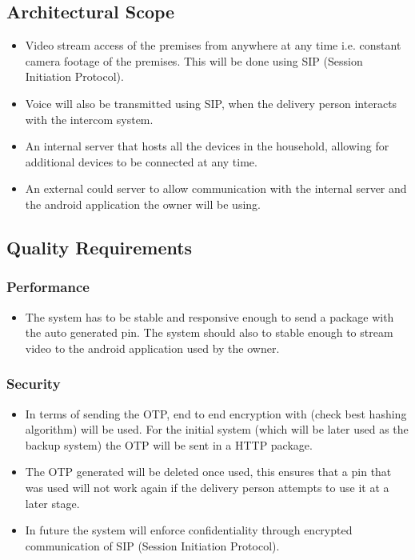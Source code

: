 \documentclass[a4paper,12pt]{article}
\begin{document}
	\newpage
	\subsection{Architectural Scope}
	\begin{itemize}
		\item Video stream access of the premises from anywhere at any time i.e. constant camera footage of the premises. This will be done using SIP (Session Initiation Protocol).
		
		\item Voice will also be transmitted using SIP, when the delivery person interacts with the intercom system.
		
		\item An internal server that hosts all the devices in the household, allowing for additional devices to be connected at any time. 
		
		\item An external could server to allow communication with the internal server and the android application the owner will be using. 
	\end{itemize}
	
	\subsection{Quality Requirements}
	
	\subsubsection{Performance}
	\begin{itemize}
		\item The system has to be stable and responsive enough to send a package with the auto generated pin. The system should also to stable enough to stream video to the android application used by the owner. 
	\end{itemize}
	
	\subsubsection{Security}
	\begin{itemize}
		\item In terms of sending the OTP, end to end encryption with (check best hashing algorithm) will be used. For the initial system (which will be later used as the backup system) the OTP will be sent in a HTTP package. 
		\item The OTP generated will be deleted once used, this ensures that a pin that was used will not work again if the delivery person attempts to use it at a later stage.
		\item In future the system will enforce confidentiality through encrypted communication of SIP (Session Initiation Protocol).
	\end{itemize}
	
\end{document}
